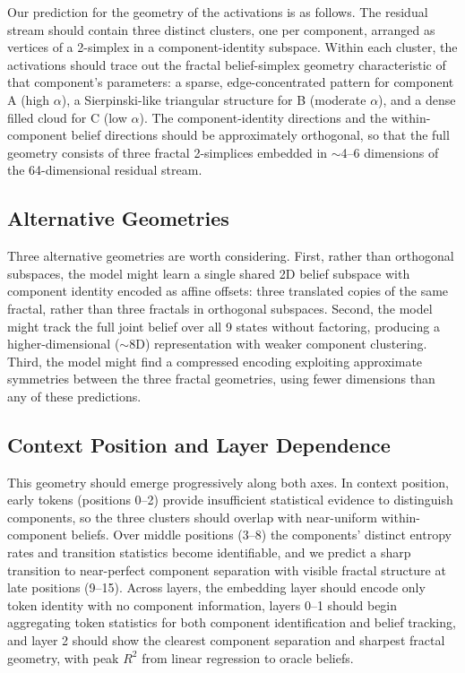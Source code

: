\documentclass{article}
\begin{document}
Our prediction for the geometry of the activations is as follows. The residual stream should contain three distinct clusters, one per component, arranged as vertices of a 2-simplex in a component-identity subspace. Within each cluster, the activations should trace out the fractal belief-simplex geometry characteristic of that component's parameters: a sparse, edge-concentrated pattern for component A (high $\alpha$), a Sierpinski-like triangular structure for B (moderate $\alpha$), and a dense filled cloud for C (low $\alpha$). The component-identity directions and the within-component belief directions should be approximately orthogonal, so that the full geometry consists of three fractal 2-simplices embedded in $\sim$4--6 dimensions of the 64-dimensional residual stream.

\subsection{Alternative Geometries}

Three alternative geometries are worth considering. First, rather than orthogonal subspaces, the model might learn a single shared 2D belief subspace with component identity encoded as affine offsets: three translated copies of the same fractal, rather than three fractals in orthogonal subspaces. Second, the model might track the full joint belief over all 9 states without factoring, producing a higher-dimensional ($\sim$8D) representation with weaker component clustering. Third, the model might find a compressed encoding exploiting approximate symmetries between the three fractal geometries, using fewer dimensions than any of these predictions.

\subsection{Context Position and Layer Dependence}

This geometry should emerge progressively along both axes. In context position, early tokens (positions 0--2) provide insufficient statistical evidence to distinguish components, so the three clusters should overlap with near-uniform within-component beliefs. Over middle positions (3--8) the components' distinct entropy rates and transition statistics become identifiable, and we predict a sharp transition to near-perfect component separation with visible fractal structure at late positions (9--15). Across layers, the embedding layer should encode only token identity with no component information, layers 0--1 should begin aggregating token statistics for both component identification and belief tracking, and layer 2 should show the clearest component separation and sharpest fractal geometry, with peak $R^2$ from linear regression to oracle beliefs.
\end{document}
